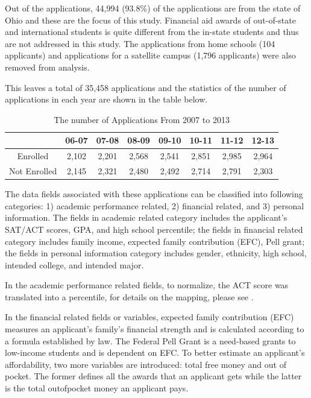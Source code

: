 \documentclass[12pt,english]{report}
\begin{document}
Out of the applications, 44,994 (93.8\%) of the applications are from the state of Ohio and these are the focus of this study. Financial aid awards of out-of-state and international students is quite different from the in-state students and thus are not addressed in this study. The applications from home schools (104 applicants) and applications for a satellite campus (1,796 applicants) were also removed from analysis. 

This leaves a total of 35,458 applications and the statistics of the number of applications in each year are shown in the table below. 
\begin{table}[ht]
\centering
\begin{tabular}{|c|c|c|c|c|c|c|c|}
\hline
          & 06-07 & 07-08 & 08-09 & 09-10 & 10-11 & 11-12 & 12-13 \\ \hline
Enrolled  & 2,102  & 2,201  & 2,568  & 2,541  & 2,851  & 2,985  & 2,964  \\ \hline
Not Enrolled   & 2,145  & 2,321  & 2,480  & 2,492  & 2,714  & 2,791  & 2,303  \\ \hline
\end{tabular}
\caption{The number of Applications From 2007 to 2013}
\label{enroll_sum}
\end{table}

The data fields associated with these applications can be classified into following categories: 1) academic performance related, 2) financial related, and 3) personal information. The fields in academic related category includes the applicant's SAT/ACT scores, GPA, and high school percentile; the  fields in financial  related category includes family income, expected family contribution (EFC), Pell grant; the fields in personal information category includes gender, ethnicity, high school, intended college, and intended major.

In the academic performance related fields, to normalize, the ACT score was translated into a percentile, for details on the mapping, please see \citet{ACT_percentile}.
 
In the financial related fields or variables, expected family contribution (EFC) measures an applicant's family's financial strength and is calculated according to a formula established by law. The Federal Pell Grant is a need-based grants to low-income students and is dependent on EFC. To better estimate an applicant's affordability, two more variables are introduced: total free money and out of pocket. The former defines all the awards that an applicant gets while the latter is the total out\-of\-pocket money an applicant pays. 
\end{document}
